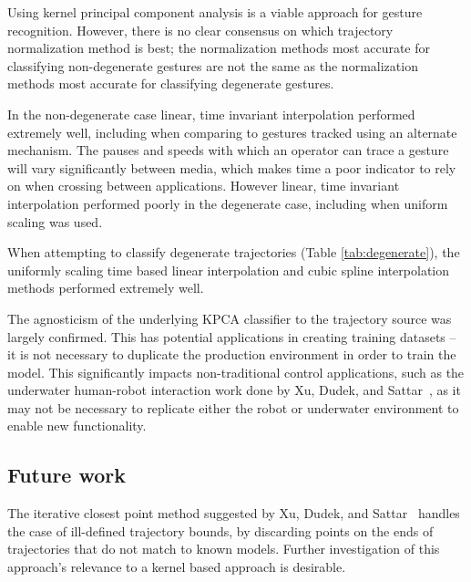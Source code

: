 \documentclass[12pt,journal,compsoc]{IEEEtran}
\begin{document}
Using kernel principal component analysis is a viable approach for gesture recognition. 
However, there is no clear consensus on which trajectory normalization method is best;
the normalization methods most accurate for classifying non-degenerate gestures are not
the same as the normalization methods most accurate for classifying degenerate gestures.
\par
In the non-degenerate case linear, time invariant interpolation performed extremely well,
including when comparing to gestures tracked using an alternate mechanism. The pauses and
speeds with which an operator can trace a gesture will vary significantly between media, which
makes time a poor indicator to rely on when crossing between applications. However linear,
time invariant interpolation performed poorly in the degenerate case, including when
uniform scaling was used.
\par
When attempting to classify degenerate trajectories (Table \ref{tab:degenerate}),
the uniformly scaling time based linear interpolation and cubic spline interpolation
methods performed extremely well.
\par
The agnosticism of the underlying KPCA classifier to the trajectory source was
largely confirmed. This has potential applications in creating training datasets --
it is not necessary to duplicate the production environment in order to train the model.
This significantly impacts non-traditional control applications, such as the underwater
human-robot interaction work done by Xu, Dudek, and Sattar~\cite{xu08}, as it may not
be necessary to replicate either the robot or underwater environment to enable new
functionality.

\subsection{Future work}

The iterative closest point method suggested by Xu, Dudek, and Sattar~\cite{xu08}
handles the case of ill-defined trajectory bounds, by discarding points on the ends
of trajectories that do not match to known models. Further investigation of this
approach's relevance to a kernel based approach is desirable.


\nocite{*}

{}

\clearpage

\clearpage

\end{document}
